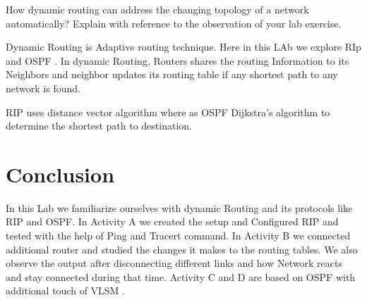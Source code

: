 \documentclass[a4paper,11pt]{article}
\begin{document}

\begin{Q}
    {
        How dynamic routing can address the changing topology of a network automatically?
        Explain with reference to the observation of your lab exercise.
    }
\end{Q}

\begin{A}
    {
        Dynamic Routing is Adaptive routing technique. Here in this LAb we explore RIp and OSPF . In dynamic Routing, Routers shares the routing Information to its Neighbors and neighbor updates its routing table if any shortest path to any network is found.

        RIP uses distance vector algorithm where as OSPF Dijkstra’s algorithm to determine the shortest path to destination.
    }
\end{A}






\section{Conclusion}

In this Lab we familiarize ourselves with dynamic Routing and its protocols like RIP and OSPF.
In Activity A we created the setup and Configured RIP and tested with the help of Ping and Tracert command. In Activity B we connected additional router and studied the changes it makes to the routing tables. We also observe the output after disconnecting different links and how Network reacts and stay connected during that time. Activity C and D are based on OSPF with additional touch of VLSM .
\end{document}
